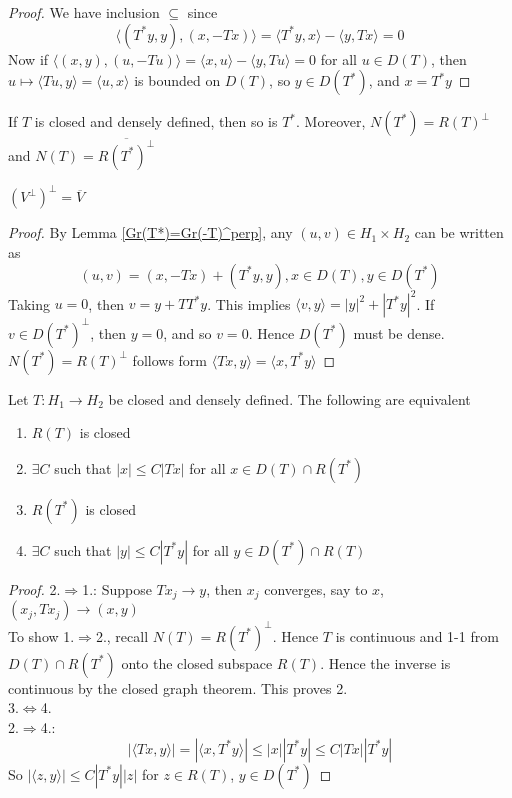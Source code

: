 \documentclass[../main.tex]{subfiles}
\begin{document}
\begin{proof}
We have inclusion $\subseteq$ since
\[\langle(T^*y,y),(x,-Tx)\rangle=\langle T^*y,x\rangle-\langle y,Tx\rangle=0\]
Now if $\langle(x,y),(u,-Tu)\rangle=\langle x,u\rangle-\langle y,Tu\rangle=0$ for all $u\in D(T)$, then $u\mapsto\langle Tu,y\rangle=\langle u,x\rangle$ is bounded on $D(T)$, so $y\in D(T^*)$, and $x=T^*y$
\end{proof}

\begin{theorem}
If $T$ is closed and densely defined, then so is $T^*$. Moreover, $N(T^*)=R(T)^\perp$ and $N(T)=\overline{R(T^*)^\perp}$
\end{theorem}

\begin{note}
$(V^\perp)^\perp=\overline V$
\end{note}

\begin{proof}
By Lemma \ref{Gr(T*)=Gr(-T)^perp}, any $(u,v)\in H_1\times H_2$ can be written as
\[(u,v)=(x,-Tx)+(T^*y,y),x\in D(T),y\in D(T^*)\]
Taking $u=0$, then $v=y+TT^*y$. This implies $\langle v,y\rangle=|y|^2+|T^*y|^2$. If $v\in D(T^*)^\perp$, then $y=0$, and so $v=0$. Hence $D(T^*)$ must be dense. $N(T^*)=R(T)^\perp$ follows form $\langle Tx,y\rangle=\langle x,T^*y\rangle$
\end{proof}

\begin{proposition}\label{T closed, densely defined, equivalent conditions for R(T) closed}
Let $T:H_1\to H_2$ be closed and densely defined. The following are equivalent
\begin{enumerate}
\item $R(T)$ is closed
\item $\exists C$ such that $|x|\leq C|Tx|$ for all $x\in D(T)\cap R(T^*)$
\item $R(T^*)$ is closed
\item $\exists C$ such that $|y|\leq C|T^*y|$ for all $y\in D(T^*)\cap R(T)$
\end{enumerate}
\end{proposition}

\begin{proof}
2.$\Rightarrow$1.: Suppose $Tx_j\to y$, then $x_j$ converges, say to $x$, $(x_j,Tx_j)\to (x,y)$ \\
To show 1.$\Rightarrow$2., recall $N(T)=R(T^*)^\perp$. Hence $T$ is continuous and 1-1 from $D(T)\cap R(T^*)$ onto the closed subspace $R(T)$. Hence the inverse is continuous by the closed graph theorem. This proves 2. \\
3.$\iff$4. \\
2.$\Rightarrow$4.:
\[|\langle Tx,y\rangle|=|\langle x,T^*y\rangle|\leq|x||T^*y|\leq C|Tx||T^*y|\]
So $|\langle z,y\rangle|\leq C|T^*y||z|$ for $z\in R(T)$, $y\in D(T^*)$
\end{proof}
\end{document}
